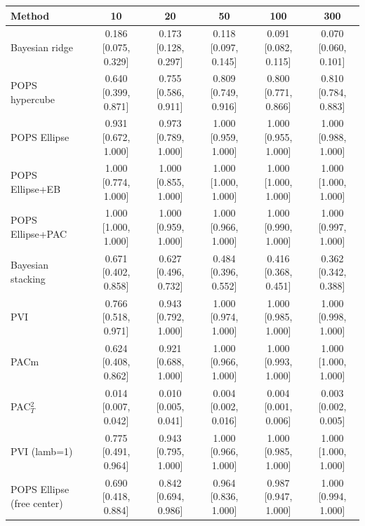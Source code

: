 \begin{tabular}{lccccc}
\toprule
Method & 10 & 20 & 50 & 100 & 300 \\
\midrule
Bayesian ridge & 0.186 {\scriptsize[0.075, 0.329]} & 0.173 {\scriptsize[0.128, 0.297]} & 0.118 {\scriptsize[0.097, 0.145]} & 0.091 {\scriptsize[0.082, 0.115]} & 0.070 {\scriptsize[0.060, 0.101]} \\
POPS hypercube & 0.640 {\scriptsize[0.399, 0.871]} & 0.755 {\scriptsize[0.586, 0.911]} & 0.809 {\scriptsize[0.749, 0.916]} & 0.800 {\scriptsize[0.771, 0.866]} & 0.810 {\scriptsize[0.784, 0.883]} \\
POPS Ellipse & 0.931 {\scriptsize[0.672, 1.000]} & 0.973 {\scriptsize[0.789, 1.000]} & 1.000 {\scriptsize[0.959, 1.000]} & 1.000 {\scriptsize[0.955, 1.000]} & 1.000 {\scriptsize[0.988, 1.000]} \\
POPS Ellipse+EB & 1.000 {\scriptsize[0.774, 1.000]} & 1.000 {\scriptsize[0.855, 1.000]} & 1.000 {\scriptsize[1.000, 1.000]} & 1.000 {\scriptsize[1.000, 1.000]} & 1.000 {\scriptsize[1.000, 1.000]} \\
POPS Ellipse+PAC & 1.000 {\scriptsize[1.000, 1.000]} & 1.000 {\scriptsize[0.959, 1.000]} & 1.000 {\scriptsize[0.966, 1.000]} & 1.000 {\scriptsize[0.990, 1.000]} & 1.000 {\scriptsize[0.997, 1.000]} \\
Bayesian stacking & 0.671 {\scriptsize[0.402, 0.858]} & 0.627 {\scriptsize[0.496, 0.732]} & 0.484 {\scriptsize[0.396, 0.552]} & 0.416 {\scriptsize[0.368, 0.451]} & 0.362 {\scriptsize[0.342, 0.388]} \\
PVI & 0.766 {\scriptsize[0.518, 0.971]} & 0.943 {\scriptsize[0.792, 1.000]} & 1.000 {\scriptsize[0.974, 1.000]} & 1.000 {\scriptsize[0.985, 1.000]} & 1.000 {\scriptsize[0.998, 1.000]} \\
PACm & 0.624 {\scriptsize[0.408, 0.862]} & 0.921 {\scriptsize[0.688, 1.000]} & 1.000 {\scriptsize[0.966, 1.000]} & 1.000 {\scriptsize[0.993, 1.000]} & 1.000 {\scriptsize[1.000, 1.000]} \\
PAC$^2_T$ & 0.014 {\scriptsize[0.007, 0.042]} & 0.010 {\scriptsize[0.005, 0.041]} & 0.004 {\scriptsize[0.002, 0.016]} & 0.004 {\scriptsize[0.001, 0.006]} & 0.003 {\scriptsize[0.002, 0.005]} \\
PVI (lamb=1) & 0.775 {\scriptsize[0.491, 0.964]} & 0.943 {\scriptsize[0.795, 1.000]} & 1.000 {\scriptsize[0.966, 1.000]} & 1.000 {\scriptsize[0.985, 1.000]} & 1.000 {\scriptsize[1.000, 1.000]} \\
POPS Ellipse (free center) & 0.690 {\scriptsize[0.418, 0.884]} & 0.842 {\scriptsize[0.694, 0.986]} & 0.964 {\scriptsize[0.836, 1.000]} & 0.987 {\scriptsize[0.947, 1.000]} & 1.000 {\scriptsize[0.994, 1.000]} \\

\end{tabular}

